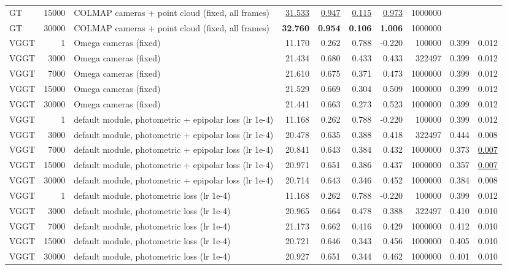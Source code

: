 \begin{table}[H]
\begin{tabular}{lrlrrrrrrr}
GT & 15000 & COLMAP cameras + point cloud (fixed, all frames) & \underline{31.533} & \underline{0.947} & \underline{0.115} & \underline{0.973} & 1000000 &  &  \\
GT & 30000 & COLMAP cameras + point cloud (fixed, all frames) & \textbf{32.760} & \textbf{0.954} & \textbf{0.106} & \textbf{1.006} & 1000000 &  &  \\
VGGT & 1 & Omega cameras (fixed) & 11.170 & 0.262 & 0.788 & -0.220 & 100000 & 0.399 & 0.012 \\
VGGT & 3000 & Omega cameras (fixed) & 21.434 & 0.680 & 0.433 & 0.433 & 322497 & 0.399 & 0.012 \\
VGGT & 7000 & Omega cameras (fixed) & 21.610 & 0.675 & 0.371 & 0.473 & 1000000 & 0.399 & 0.012 \\
VGGT & 15000 & Omega cameras (fixed) & 21.529 & 0.669 & 0.304 & 0.509 & 1000000 & 0.399 & 0.012 \\
VGGT & 30000 & Omega cameras (fixed) & 21.441 & 0.663 & 0.273 & 0.523 & 1000000 & 0.399 & 0.012 \\
VGGT & 1 & default module, photometric + epipolar loss (lr 1e-4) & 11.168 & 0.262 & 0.788 & -0.220 & 100000 & 0.399 & 0.012 \\
VGGT & 3000 & default module, photometric + epipolar loss (lr 1e-4) & 20.478 & 0.635 & 0.388 & 0.418 & 322497 & 0.444 & 0.008 \\
VGGT & 7000 & default module, photometric + epipolar loss (lr 1e-4) & 20.841 & 0.643 & 0.384 & 0.432 & 1000000 & 0.373 & \underline{0.007} \\
VGGT & 15000 & default module, photometric + epipolar loss (lr 1e-4) & 20.971 & 0.651 & 0.386 & 0.437 & 1000000 & 0.357 & \underline{0.007} \\
VGGT & 30000 & default module, photometric + epipolar loss (lr 1e-4) & 20.714 & 0.643 & 0.346 & 0.452 & 1000000 & 0.384 & 0.008 \\
VGGT & 1 & default module, photometric loss (lr 1e-4) & 11.168 & 0.262 & 0.788 & -0.220 & 100000 & 0.399 & 0.012 \\
VGGT & 3000 & default module, photometric loss (lr 1e-4) & 20.965 & 0.664 & 0.478 & 0.388 & 322497 & 0.410 & 0.010 \\
VGGT & 7000 & default module, photometric loss (lr 1e-4) & 21.173 & 0.662 & 0.416 & 0.429 & 1000000 & 0.412 & 0.010 \\
VGGT & 15000 & default module, photometric loss (lr 1e-4) & 20.721 & 0.646 & 0.343 & 0.456 & 1000000 & 0.405 & 0.010 \\
VGGT & 30000 & default module, photometric loss (lr 1e-4) & 20.927 & 0.651 & 0.344 & 0.462 & 1000000 & 0.401 & 0.010 \\
\bottomrule
\end{tabular}
\end{table}